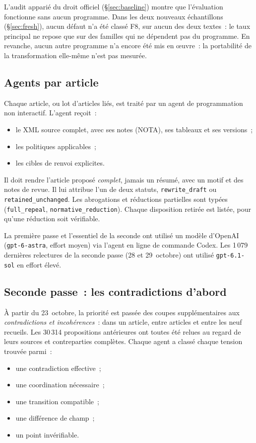 \documentclass[11pt,a4paper]{article}
\begin{document}
L'audit apparié du droit officiel (\S\ref{sec:baseline}) montre que l'évaluation fonctionne sans aucun programme. Dans les deux nouveaux échantillons (\S\ref{sec:fresh}), aucun défaut n'a été classé F8, sur aucun des deux textes~: le taux principal ne repose que sur des familles qui ne dépendent pas du programme. En revanche, aucun autre programme n'a encore été mis en \oe{}uvre~: la portabilité de la transformation elle-même n'est pas mesurée.

\subsection{Agents par article}

Chaque article, ou lot d'articles liés, est traité par un agent de programmation non interactif. L'agent reçoit~:
\begin{itemize}
  \item le XML source complet, avec ses notes (NOTA), ses tableaux et ses versions~;
  \item les politiques applicables~;
  \item les cibles de renvoi explicites.
\end{itemize}
Il doit rendre l'article proposé \emph{complet}, jamais un résumé, avec un motif et des notes de revue. Il lui attribue l'un de deux statuts, \texttt{rewrite\_draft} ou \texttt{retained\_unchanged}. Les abrogations et réductions partielles sont typées (\texttt{full\_repeal}, \texttt{normative\_reduction}). Chaque disposition retirée est listée, pour qu'une réduction soit vérifiable.

La première passe et l'essentiel de la seconde ont utilisé un modèle d'OpenAI (\texttt{gpt-6-astra}, effort moyen) via l'agent en ligne de commande Codex. Les 1\,079 dernières relectures de la seconde passe (28 et 29~octobre) ont utilisé \texttt{gpt-6.1-sol} en effort élevé.

\subsection{Seconde passe~: les contradictions d'abord}

À partir du 23~octobre, la priorité est passée des coupes supplémentaires aux \emph{contradictions et incohérences}~: dans un article, entre articles et entre les neuf recueils. Les 30\,314 propositions antérieures ont toutes été relues au regard de leurs sources et contreparties complètes. Chaque agent a classé chaque tension trouvée parmi~:
\begin{itemize}
  \item une contradiction effective~;
  \item une coordination nécessaire~;
  \item une transition compatible~;
  \item une différence de champ~;
  \item un point invérifiable.
\end{itemize}
\end{document}
